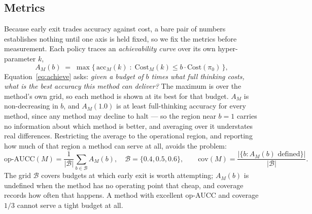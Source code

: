 \documentclass[acmsmall]{acmart}
\theoremstyle{acmdefinition}%
\theoremstyle{acmplain}}{}%
\begin{document}
\subsection{Metrics}
Because early exit trades accuracy against cost, a bare pair of numbers establishes nothing until one axis is held fixed, so we fix the metrics before measurement. Each policy traces an \emph{achievability curve} over its own hyper-parameter $k$,
\begin{equation}
A_M(b) \;=\; \max\big\{\, \mathrm{acc}_M(k) \;:\; \mathrm{Cost}_M(k) \leq b \cdot \mathrm{Cost}(\pi_0) \,\big\},
\label{eq:achieve}
\end{equation}
Equation~\eqref{eq:achieve} asks: \emph{given a budget of $b$ times what full thinking costs, what is the best accuracy this method can deliver?} The maximum is over the method's own grid, so each method is shown at its best for that budget. $A_M$ is non-decreasing in $b$, and $A_M(1.0)$ is at least full-thinking accuracy for every method, since any method may decline to halt --- so the region near $b=1$ carries no information about which method is better, and averaging over it understates real differences. Restricting the average to the operational region, and reporting how much of that region a method can serve at all, avoids the problem:
\begin{equation}
\text{op-AUCC}(M) = \frac{1}{|\mathcal{B}|}\sum_{b\in\mathcal{B}} A_M(b), \quad \mathcal{B}=\{0.4,0.5,0.6\},
\qquad
\mathrm{cov}(M) = \frac{|\{b : A_M(b) \text{ defined}\}|}{|\mathcal{B}|}.
\label{eq:aucc}
\end{equation}
The grid $\mathcal{B}$ covers budgets at which early exit is worth attempting; $A_M(b)$ is undefined when the method has no operating point that cheap, and coverage records how often that happens. A method with excellent op-AUCC and coverage $1/3$ cannot serve a tight budget at all.
\end{document}

